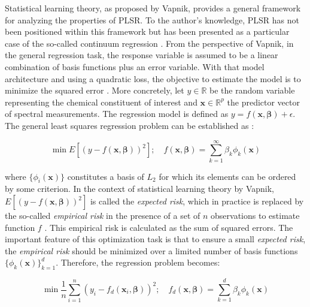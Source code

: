 \documentclass[journal=ancham,manuscript=article]{achemso}
\begin{document}
Statistical learning theory, as proposed by Vapnik\cite{Chapelle2002}, provides a general framework for analyzing the properties of PLSR. To the author's knowledge, PLSR has not been positioned within this framework but has been presented as a particular case of the so-called continuum regression \cite{Stone1990}. From the perspective of Vapnik, in the general regression task, the response variable is assumed to be a linear combination of basis functions plus an error variable. With that model architecture and using a quadratic loss, the objective to estimate the model is to minimize the squared error \cite{Chapelle2002}. More concretely, let $y \in \mathbb{R}$ be the random variable representing the chemical constituent of interest and  $\mathbf{x} \in \mathbb{R}^{p}$ the predictor vector of spectral measurements. The regression model is defined as $y = f(\mathbf{x}, \boldsymbol{\beta}) + \epsilon$.  The general least squares regression problem can be established as \cite{Chapelle2002}:

\begin{equation}
    \min E \left[ (y-f(\mathbf{x}, \boldsymbol{\beta}))^2\right]; \quad f(\mathbf{x}, \boldsymbol{\beta}) = \sum_{k=1}^{\infty} \beta_k \phi_{k}(\mathbf{x})
    \label{eq_general_regression_problem}
\end{equation}

where $\{\phi_{i}(\mathbf{x})\}$ constitutes a basis of $L_2$ for which its elements can be ordered by some criterion. In the context of statistical learning theory by Vapnik, $E \left[ (y-f(\mathbf{x}, \boldsymbol{\beta}))^2\right]$ is called the \emph{expected risk}, which in practice is replaced by the so-called \emph{empirical risk} in the presence of a set of $n$ observations to estimate function $f$ \cite{Vapnik2000}. This empirical risk is calculated as the sum of squared errors. The important feature of this optimization task is that to ensure a small \emph{expected risk}, the \emph{empirical risk} should be minimized over a limited number of basis functions $\{\phi_{k}(\mathbf{x})\}_{k=1}^d$. Therefore, the regression problem becomes:

\begin{equation}
    \min \frac{1}{n} \sum_{i=1}^n (y_i-f_d(\mathbf{x}_i, \boldsymbol{\beta}))^2; \quad f_d(\mathbf{x}, \boldsymbol{\beta}) = \sum_{k=1}^{d} \beta_k \phi_{k}(\mathbf{x})
    \label{eq_square_loss_empirical_regression_problem}
\end{equation}
\end{document}
